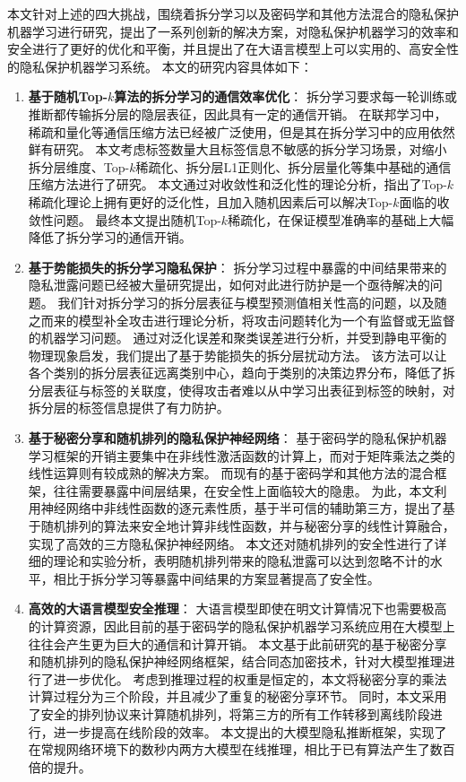 本文针对上述的四大挑战，围绕着拆分学习以及密码学和其他方法混合的隐私保护机器学习进行研究，提出了一系列创新的解决方案，对隐私保护机器学习的效率和安全进行了更好的优化和平衡，并且提出了在大语言模型上可以实用的、高安全性的隐私保护机器学习系统。
%
本文的研究内容具体如下：
%
\begin{enumerate}[label={(\arabic*)}]
    \item \textbf{基于随机Top-$k$算法的拆分学习的通信效率优化}：
    拆分学习要求每一轮训练或推断都传输拆分层的隐层表征，因此具有一定的通信开销。
    在联邦学习中，稀疏和量化等通信压缩方法已经被广泛使用，但是其在拆分学习中的应用依然鲜有研究。
    本文考虑标签数量大且标签信息不敏感的拆分学习场景，对缩小拆分层维度、Top-$k$稀疏化、拆分层L1正则化、拆分层量化等集中基础的通信压缩方法进行了研究。
    本文通过对收敛性和泛化性的理论分析，指出了Top-$k$稀疏化理论上拥有更好的泛化性，且加入随机因素后可以解决Top-$k$面临的收敛性问题。
    最终本文提出随机Top-$k$稀疏化，在保证模型准确率的基础上大幅降低了拆分学习的通信开销。
    
    \item \textbf{基于势能损失的拆分学习隐私保护}：
    拆分学习过程中暴露的中间结果带来的隐私泄露问题已经被大量研究提出，如何对此进行防护是一个亟待解决的问题。
    我们针对拆分学习的拆分层表征与模型预测值相关性高的问题，以及随之而来的模型补全攻击进行理论分析，将攻击问题转化为一个有监督或无监督的机器学习问题。
    通过对泛化误差和聚类误差进行分析，并受到静电平衡的物理现象启发，我们提出了基于势能损失的拆分层扰动方法。
    该方法可以让各个类别的拆分层表征远离类别中心，趋向于类别的决策边界分布，降低了拆分层表征与标签的关联度，使得攻击者难以从中学习出表征到标签的映射，对拆分层的标签信息提供了有力防护。

    \item \textbf{基于秘密分享和随机排列的隐私保护神经网络}：
    基于密码学的隐私保护机器学习框架的开销主要集中在非线性激活函数的计算上，而对于矩阵乘法之类的线性运算则有较成熟的解决方案。
    而现有的基于密码学和其他方法的混合框架，往往需要暴露中间层结果，在安全性上面临较大的隐患。
    为此，本文利用神经网络中非线性函数的逐元素性质，基于半可信的辅助第三方，提出了基于随机排列的算法来安全地计算非线性函数，并与秘密分享的线性计算融合，实现了高效的三方隐私保护神经网络。
    本文还对随机排列的安全性进行了详细的理论和实验分析，表明随机排列带来的隐私泄露可以达到忽略不计的水平，相比于拆分学习等暴露中间结果的方案显著提高了安全性。
 
    \item \textbf{高效的大语言模型安全推理}：
    大语言模型即使在明文计算情况下也需要极高的计算资源，因此目前的基于密码学的隐私保护机器学习系统应用在大模型上往往会产生更为巨大的通信和计算开销。
    本文基于此前研究的基于秘密分享和随机排列的隐私保护神经网络框架，结合同态加密技术，针对大模型推理进行了进一步优化。
    考虑到推理过程的权重是恒定的，本文将秘密分享的乘法计算过程分为三个阶段，并且减少了重复的秘密分享环节。
    同时，本文采用了安全的排列协议来计算随机排列，将第三方的所有工作转移到离线阶段进行，进一步提高在线阶段的效率。
    本文提出的大模型隐私推断框架，实现了在常规网络环境下的数秒内两方大模型在线推理，相比于已有算法产生了数百倍的提升。
\end{enumerate}